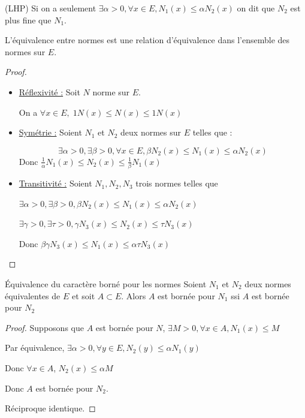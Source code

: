 \begin{remarque}
    (LHP) Si on a seulement $\exists \alpha > 0, \forall x \in E, N_1(x) \leqslant \alpha N_2(x)$
    on dit que $N_2$ est plus fine que $N_1$. 
\end{remarque}

\begin{propositionnt}{}{}
    L'équivalence entre normes est une relation d'équivalence dans l'ensemble des normes
    sur $E$. 
\end{propositionnt}

\begin{proof}~\\
    \begin{itemize}
        \item \uline{Réflexivité :}
        Soit $N $ norme sur $E$. 

        On a $\forall x \in E, \; 1 N(x) \leqslant N(x) \leqslant 1N(x)$

        \item \uline{Symétrie :}
        Soient $N_1$ et $N_2$ deux normes sur $E$ telles que : 

        $$ \exists \alpha > 0, \exists \beta > 0, \forall x \in E, \beta N_2(x) \leqslant N_1(x) \leqslant \alpha N_2(x)$$
        Donc $\frac 1 \alpha N_1(x) \leqslant N_2(x) \leqslant \frac 1 \beta N_1(x)$

        \item \uline{Transitivité :}
        Soient $N_1, N_2, N_3$ trois normes telles que 

        $\exists \alpha > 0, \exists \beta >0 , \beta N_2(x) \leqslant N_1(x) \leqslant \alpha N_2(x)$

        $\exists \gamma > 0, \exists \tau > 0, \gamma N_3(x) \leqslant N_2(x) \leqslant \tau N_3(x)$

        Donc $\beta \gamma N_3(x) \leqslant N_1(x) \leqslant \alpha \tau N_3(x)$
    \end{itemize}
\end{proof}

\begin{proposition}{Équivalence du caractère borné pour les normes}{}
    Soient $N_1$ et $N_2$ deux normes équivalentes de $E$ et soit $A \subset E$. 
    Alors $A$ est bornée pour $N_1$ ssi $A$ est bornée pour $N_2$
\end{proposition}


\begin{proof}
    Supposons que $A$ est bornée pour $N$, $\exists M > 0, \forall x \in A, N_1(x) \leqslant M$

    Par équivalence, $\exists \alpha > 0, \forall y \in E, N_2(y) \leqslant \alpha N_1(y)$

    Donc $\forall x \in A$, $N_2(x) \leqslant \alpha M$

    Donc $A$ est bornée pour $N_2$.

    Réciproque identique.
\end{proof}

